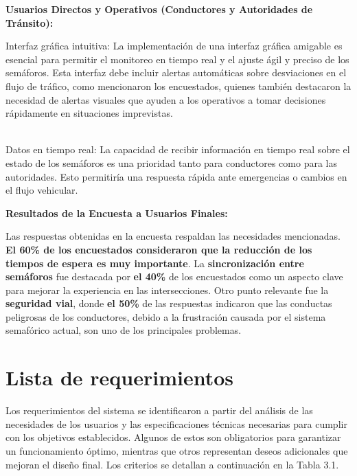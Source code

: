 \documentclass[12pt,a4paper,oneside]{report}
\begin{document}
\textbf{Usuarios Directos y Operativos (Conductores y Autoridades de Tránsito):}

Interfaz gráfica intuitiva: La implementación de una interfaz gráfica amigable es esencial para permitir el monitoreo en tiempo real y el ajuste ágil y preciso de los semáforos. Esta interfaz debe incluir alertas automáticas sobre desviaciones en el flujo de tráfico, como mencionaron los encuestados, quienes también destacaron la necesidad de alertas visuales que ayuden a los operativos a tomar decisiones rápidamente en situaciones imprevistas.\\
\strut \\
Datos en tiempo real: La capacidad de recibir información en tiempo real sobre el estado de los semáforos es una prioridad tanto para conductores como para las autoridades. Esto permitiría una respuesta rápida ante emergencias o cambios en el flujo vehicular.

\textbf{Resultados de la Encuesta a Usuarios Finales:}

Las respuestas obtenidas en la encuesta respaldan las necesidades mencionadas. \textbf{El 60\% de los encuestados consideraron que la reducción de los tiempos de espera es muy importante}. La \textbf{sincronización entre semáforos} fue destacada por \textbf{el 40\%} de los encuestados como un aspecto clave para mejorar la experiencia en las intersecciones. Otro punto relevante fue la \textbf{seguridad vial}, donde \textbf{el 50\%} de las respuestas indicaron que las conductas peligrosas de los conductores, debido a la frustración causada por el sistema semafórico actual, son uno de los principales problemas.

\section{Lista de requerimientos}\label{lista-de-requerimientos}

Los requerimientos del sistema se identificaron a partir del análisis de las necesidades de los usuarios y las especificaciones técnicas necesarias para cumplir con los objetivos establecidos. Algunos de estos son obligatorios para garantizar un funcionamiento óptimo, mientras que otros representan deseos adicionales que mejoran el diseño final. Los criterios se detallan a continuación en la Tabla 3.1.

\label{tbl:3.1}
\end{document}
